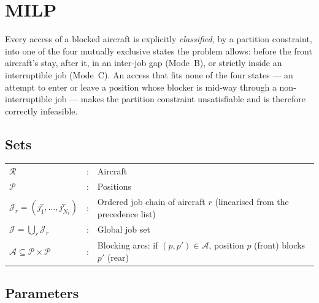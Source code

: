 %

\section{MILP}

Every access of a blocked aircraft is explicitly \emph{classified}, by a
partition constraint, into one of the four mutually exclusive states the
problem allows: before the front aircraft's stay, after it, in an
inter-job gap (Mode~B), or strictly inside an interruptible job
(Mode~C).  An access that fits none of the four states --- an attempt to
enter or leave a position whose blocker is mid-way through a
non-interruptible job --- makes the partition constraint unsatisfiable
and is therefore correctly infeasible.

\subsection{Sets}

\begin{tabular}{l c l}
    $\mathcal{R}$ & : & Aircraft \\
    $\mathcal{P}$ & : & Positions \\
    $\mathcal{J}_r = (j^r_1, \ldots, j^r_{N_r})$ & : & Ordered job chain of aircraft $r$ (linearised from the precedence list) \\
    $\mathcal{J} = \bigcup_{r} \mathcal{J}_r$ & : & Global job set \\
    $\mathcal{A} \subseteq \mathcal{P} \times \mathcal{P}$ & : & Blocking arcs: if $(p,p') \in \mathcal{A}$, position $p$ (front) blocks $p'$ (rear)
\end{tabular}

\subsection{Parameters}

